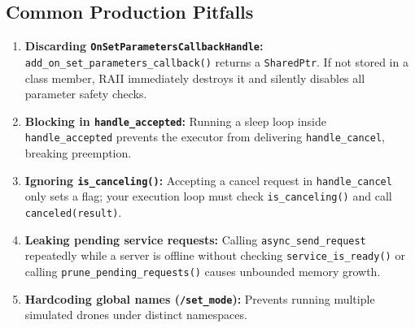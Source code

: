 \documentclass{article}
\begin{document}
\subsection{Common Production Pitfalls}
\begin{enumerate}
    \item \textbf{Discarding \texttt{OnSetParametersCallbackHandle}:} \texttt{add\_on\_set\_\allowbreak parameters\_callback()} returns a \texttt{SharedPtr}. If not stored in a class member, RAII immediately destroys it and silently disables all parameter safety checks.
    \item \textbf{Blocking in \texttt{handle\_accepted}:} Running a sleep loop inside \texttt{handle\_accepted} prevents the executor from delivering \texttt{handle\_cancel}, breaking preemption.
    \item \textbf{Ignoring \texttt{is\_canceling()}:} Accepting a cancel request in \texttt{handle\_cancel} only sets a flag; your execution loop must check \texttt{is\_canceling()} and call \texttt{canceled(result)}.
    \item \textbf{Leaking pending service requests:} Calling \texttt{async\_send\_request} repeatedly while a server is offline without checking \texttt{service\_is\_ready()} or calling \texttt{prune\_pending\_requests()} causes unbounded memory growth.
    \item \textbf{Hardcoding global names (\texttt{/set\_mode}):} Prevents running multiple simulated drones under distinct namespaces.
\end{enumerate}
\end{document}

